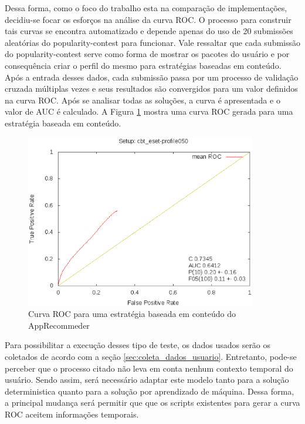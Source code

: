 Dessa forma, como o foco do trabalho esta na comparação de implementações,
decidiu-se focar os esforços na análise da curva ROC. O processo para construir
tais curvas se encontra automatizado e depende apenas do uso de
20 submissões aleatórias do popularity-contest para funcionar. Vale ressaltar
que cada submissão do popularity-contest serve como forma de mostrar os pacotes
do usuário e por consequência criar o perfil do mesmo para estratégias baseadas
em conteúdo. Após a entrada desses dados, cada submissão passa por um processo de
validação cruzada múltiplas vezes e seus resultados são convergidos para um
valor definidos na curva ROC. Após se analisar todas as soluções, a curva é
apresentada e o valor de AUC é calculado. A Figura \ref{fig:roc_apprecommender}
mostra uma curva ROC gerada para uma estratégia baseada em conteúdo.

\begin{figure}[h]
  \centering
  \includegraphics[width=0.9\textwidth]{figuras/roc_apprecommender.eps}
  \caption{Curva ROC para uma estratégia baseada em conteúdo do AppRecommeder}
  \label{fig:roc_apprecommender}
\end{figure}


Para possibilitar a execução desses tipo de teste, os dados usados serão os
coletados de acordo com a seção \ref{sec:coleta_dados_usuario}. Entretanto,
pode-se perceber que o processo citado não leva em conta nenhum contexto temporal
do usuário. Sendo assim, será necessário adaptar este modelo tanto para a
solução deterministica quanto para a solução por aprendizado de máquina. Dessa
forma, a principal mudança será permitir que que os scripts existentes para
gerar a curva ROC aceitem informações temporais.

